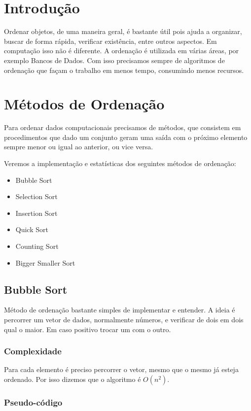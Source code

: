 \section{Introdução}

Ordenar objetos, de uma maneira geral, é bastante útil pois ajuda a
organizar, buscar de forma rápida, verificar existência, entre outros
aspectos. Em computação isso não é diferente. A ordenação é utilizada em
várias áreas, por exemplo Bancos de Dados. Com isso precisamos sempre de
algoritmos de ordenação que façam o trabalho em menos tempo, consumindo
menos recursos.

\section{Métodos de Ordenação}

Para ordenar dados computacionais precisamos de métodos, que consistem
em procedimentos que dado um conjunto geram uma saída com o próximo
elemento sempre menor ou igual ao anterior, ou vice versa.

Veremos a implementação e estatísticas dos seguintes métodos de
ordenação:

\begin{itemize}
\item
  Bubble Sort
\item
  Selection Sort
\item
  Insertion Sort
\item
  Quick Sort
\item
  Counting Sort
\item
  Bigger Smaller Sort
\end{itemize}
\subsection{Bubble Sort}

Método de ordenação bastante simples de implementar e entender. A ideia
é percorrer um vetor de dados, normalmente números, e verificar de dois
em dois qual o maior. Em caso positivo trocar um com o outro.

\subsubsection{Complexidade}

Para cada elemento é preciso percorrer o vetor, mesmo que o mesmo já
esteja ordenado. Por isso dizemos que o algoritmo é $O(n^2)$.

\subsubsection{Pseudo-código}

